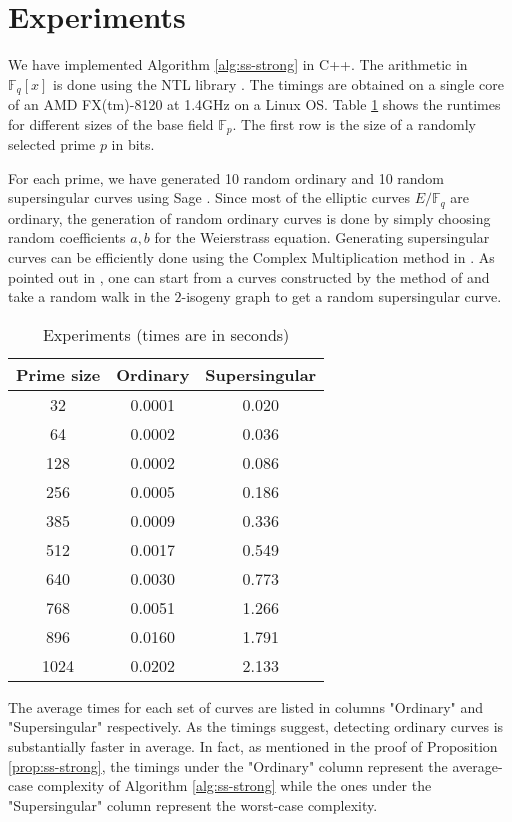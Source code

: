 \documentclass[12pt]{article}
\theoremstyle{plain}
\theoremstyle{definition}
\def\F{\ensuremath{\mathbb{F}}}
\begin{document}


\section{Experiments}

We have implemented Algorithm \ref{alg:ss-strong} in C++. The arithmetic in $\F_q[x]$ is done using 
the NTL library \cite{shoup2001ntl}. The timings are obtained on a single core of an AMD 
FX(tm)-8120 at 1.4GHz on a Linux OS. Table \ref{table:exper} shows the runtimes for different sizes 
of the base field $\F_p$. The first row is the size of a randomly selected prime $p$ in bits.

For each prime, we have generated 10 random ordinary and 10 random supersingular curves using Sage 
\cite{stein2008sage}. Since most of the elliptic curves $E/\F_q$ are ordinary, the generation of 
random ordinary curves is done by simply choosing random coefficients $a, b$ for the Weierstrass 
equation. Generating supersingular curves can be efficiently done using the Complex Multiplication 
method in \cite{broker2009}. As pointed out in \cite{sutherland2012}, one can start from a curves 
constructed by the method of \cite{broker2009} and take a random walk in the $2$-isogeny graph to 
get a random supersingular curve.

\begin{table}[H]
	\centering
	\footnotesize
	\begin{tabular}{|ccc|}
		\hline
		\bfseries Prime size & \bfseries Ordinary & \bfseries Supersingular \\
		\hline
		\hline
		32 & 0.0001 & 0.020 \\
		64 & 0.0002 & 0.036 \\
		128 & 0.0002 & 0.086 \\
		256 & 0.0005 & 0.186 \\
		385 & 0.0009 & 0.336 \\
		512 & 0.0017 & 0.549 \\
		640 & 0.0030 & 0.773 \\
		768 & 0.0051 & 1.266 \\
		896 & 0.0160 & 1.791 \\
		1024 & 0.0202 & 2.133 \\
		\hline
	\end{tabular}
	\label{table:exper}
	\caption{Experiments (times are in seconds)}
\end{table}

The average times for each set of curves are listed in columns "Ordinary" and "Supersingular" 
respectively. As the timings suggest, detecting ordinary curves is substantially faster in average. 
In fact, as mentioned in the proof of Proposition \ref{prop:ss-strong}, the timings under the 
"Ordinary" column represent the average-case complexity of Algorithm \ref{alg:ss-strong} while the 
ones under the "Supersingular" column represent the worst-case complexity.






\end{document}
